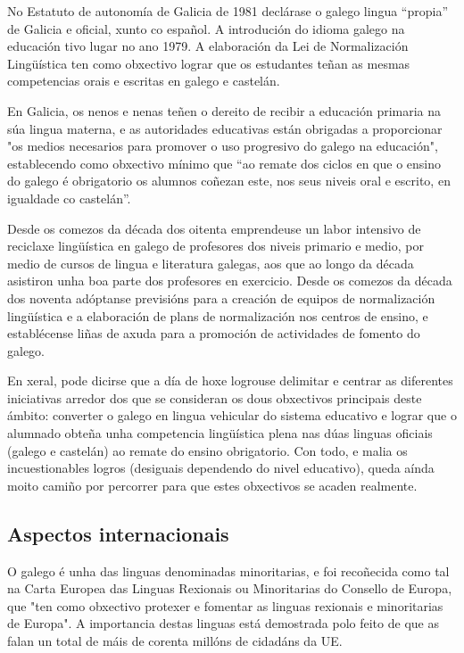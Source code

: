 \begin{multicols}{2}
No Estatuto de autonomía de Galicia de 1981 declárase o galego lingua “propia” de Galicia e oficial, xunto co español. A introdución do idioma galego na educación tivo lugar no ano 1979. A elaboración da Lei de Normalización Lingüística ten como obxectivo lograr que os estudantes teñan as mesmas competencias orais e escritas en galego e castelán. 

En Galicia, os nenos e nenas teñen o dereito de recibir a educación primaria na súa lingua materna, e as autoridades educativas están obrigadas a proporcionar "os medios necesarios para promover o uso progresivo do galego na educación", establecendo como obxectivo mínimo que “ao remate dos ciclos en que o ensino do galego é obrigatorio os alumnos coñezan este, nos seus niveis oral e escrito, en igualdade co castelán”. 

Desde os comezos da década dos oitenta emprendeuse un labor intensivo de reciclaxe lingüística en galego de profesores dos niveis primario e medio, por medio de cursos de lingua e literatura galegas, aos que ao longo da década asistiron unha boa parte dos profesores en exercicio. Desde os comezos da década dos noventa adóptanse previsións para a creación de equipos de normalización lingüística e a elaboración de plans de normalización nos centros de ensino, e establécense liñas de axuda para a promoción de actividades de fomento do galego.

En xeral, pode dicirse que a día de hoxe logrouse delimitar e centrar as diferentes iniciativas arredor dos que se consideran os dous obxectivos principais deste ámbito: converter o galego en lingua vehicular do sistema educativo e lograr que o alumnado obteña unha competencia lingüística plena nas dúas linguas oficiais (galego e castelán) ao remate do ensino obrigatorio. Con todo, e malia os incuestionables logros (desiguais dependendo do nivel educativo), queda aínda moito camiño por percorrer para que estes obxectivos se acaden realmente.


\subsection{Aspectos internacionais}

    O galego é unha das linguas denominadas minoritarias, e foi recoñecida como tal na Carta Europea das Linguas Rexionais ou Minoritarias do Consello de Europa, que "ten como obxectivo protexer e fomentar as linguas rexionais e minoritarias de Europa". A importancia destas linguas está demostrada polo feito de que as falan un total de máis de corenta millóns de cidadáns da UE.


\end{multicols}
